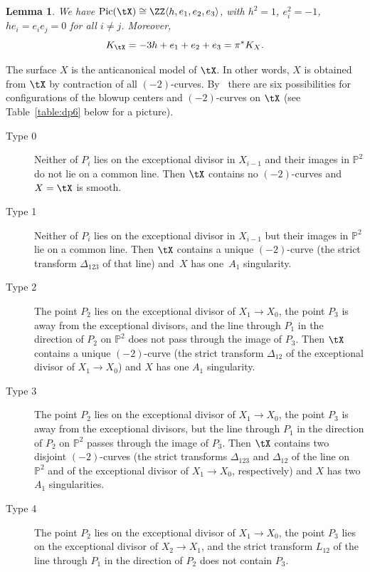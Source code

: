 \documentclass[11pt]{amsart}
\renewcommand{\P}{{\mathbb{P}}}
\DeclareMathOperator{\Pic}{\mathrm{Pic}}
\theoremstyle{plain}
\newtheorem{lemma}[theorem]{Lemma}
\theoremstyle{definition}
\theoremstyle{remark}
\begin{document}
\begin{lemma}
\label{lemma:pic-tx}
We have $\Pic(\tX) \cong \ZZ\langle h, e_1,e_2,e_3 \rangle$, with $h^2 = 1$, $e_i^2 = -1$, $he_i = e_ie_j = 0$ for all $i \ne j$.
Moreover, 
\begin{equation}\label{eq:ktx}
K_\tX = -3h + e_1 + e_2 + e_3 = \pi^*K_X.
\end{equation}
\end{lemma}

The surface $X$ is the anticanonical model of $\tX$.
In other words, $X$ is obtained from $\tX$ by contraction of all $(-2)$-curves.
By~\cite[Section~8.4.2]{dolgachev2012cag} there are six possibilities for configurations of the blowup centers and $(-2)$-curves on $\tX$
(see Table~\ref{table:dp6} below for a picture).
\begin{description}
\item[Type 0] 
Neither of $P_i$ lies on the exceptional divisor in $X_{i-1}$ and their images in $\P^2$ do not lie on a common line.
Then $\tX$ contains no $(-2)$-curves and $X = \tX$ is smooth.
\item[Type 1] 
Neither of $P_i$ lies on the exceptional divisor in $X_{i-1}$ but their images in $\P^2$ lie on a common line.
Then $\tX$ contains a unique $(-2)$-curve (the strict transform $\Delta_{123}$ of that line) and~$X$ has one~$A_1$ singularity.
\item[Type 2] 
The point $P_2$ lies on the exceptional divisor of $X_1 \to X_0$, the point $P_3$ is away from the exceptional divisors, 
and the line through $P_1$ in the direction of $P_2$ on $\P^2$ does not pass through the image of $P_3$.
Then $\tX$ contains a unique $(-2)$-curve (the strict transform $\Delta_{12}$ of the exceptional divisor of $X_1 \to X_0$) and $X$ has one $A_1$ singularity.
\item[Type 3] 
The point $P_2$ lies on the exceptional divisor of $X_1 \to X_0$, the point $P_3$ is away from the exceptional divisors, 
but the line through $P_1$ in the direction of $P_2$ on $\P^2$ passes through the image of $P_3$.
Then $\tX$ contains two disjoint $(-2)$-curves 
(the strict transforms $\Delta_{123}$ and $\Delta_{12}$ of the line on~$\P^2$ and of the exceptional divisor of $X_1 \to X_0$, respectively) 
and $X$ has two $A_1$ singularities.
\item[Type 4] 
The point $P_2$ lies on the exceptional divisor of $X_1 \to X_0$, the point $P_3$ lies on the exceptional divisor of $X_2 \to X_1$, 
and the strict transform $L_{12}$ of the line through $P_1$ in the direction of $P_2$ does not contain $P_3$.

\end{description}
\end{document}
